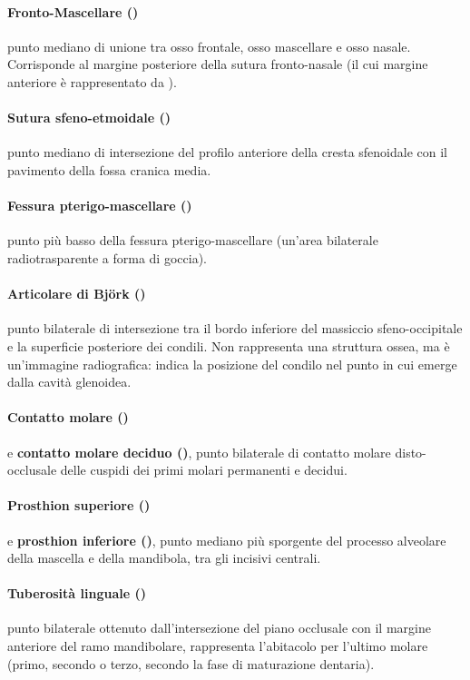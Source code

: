 \paragraph{Fronto-Mascellare ()} punto mediano di unione tra osso frontale, osso mascellare e osso nasale. Corrisponde al margine posteriore della sutura fronto-nasale (il cui margine anteriore è rappresentato da ).
\paragraph{Sutura sfeno-etmoidale ()} punto mediano di intersezione del profilo anteriore della cresta sfenoidale con il pavimento della fossa cranica media.
\paragraph{Fessura pterigo-mascellare ()} punto più basso della fessura pterigo-mascellare (un'area bilaterale radiotrasparente a forma di goccia).
\paragraph{Articolare di Björk ()} punto bilaterale di intersezione tra il bordo inferiore del massiccio sfeno-occipitale e la superficie posteriore dei condili. Non rappresenta una struttura ossea, ma è un'immagine radiografica: indica la posizione del condilo nel punto in cui emerge dalla cavità glenoidea.
\paragraph{Contatto molare ()} e \textbf{contatto molare deciduo ()}, punto bilaterale di contatto molare disto-occlusale delle cuspidi dei primi molari permanenti e decidui.
\paragraph{Prosthion superiore ()} e \textbf{prosthion inferiore ()}, punto mediano più sporgente del processo alveolare della mascella e della mandibola, tra gli incisivi centrali.
\paragraph{Tuberosità linguale ()} punto bilaterale ottenuto dall'intersezione del piano occlusale con il margine anteriore del ramo mandibolare, rappresenta l'abitacolo per l'ultimo molare (primo, secondo o terzo, secondo la fase di maturazione dentaria).

